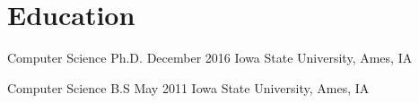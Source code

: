 \section*{Education}
\begin{pjob}
    {Computer Science}
    {Ph.D.}
    {December 2016}
    {Iowa State University, Ames, IA}
\end{pjob}

\noindent
\begin{pjob}
    {Computer Science}
    {B.S}
    {May 2011}
    {Iowa State University, Ames, IA}
\end{pjob}

\vspace{-15pt}